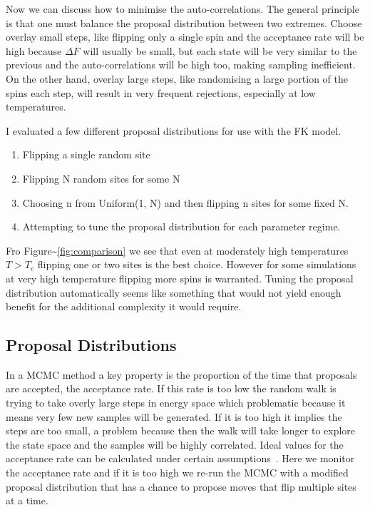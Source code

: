 Now we can discuss how to minimise the auto-correlations. The general principle is that one must balance the proposal distribution between two extremes. Choose overlay small steps, like flipping only a single spin and the acceptance rate will be high because \(\Delta F\) will usually be small, but each state will be very similar to the previous and the auto-correlations will be high too, making sampling inefficient. On the other hand, overlay large steps, like randomising a large portion of the spins each step, will result in very frequent rejections, especially at low temperatures.

I evaluated a few different proposal distributions for use with the FK model.

\begin{enumerate}
\def\labelenumi{\arabic{enumi}.}
\tightlist
\item
  Flipping a single random site
\item
  Flipping N random sites for some N
\item
  Choosing n from Uniform(1, N) and then flipping n sites for some fixed N.
\item
  Attempting to tune the proposal distribution for each parameter regime.
\end{enumerate}

Fro Figure\textasciitilde{}\ref{fig:comparison} we see that even at moderately high temperatures \(T > T_c\) flipping one or two sites is the best choice. However for some simulations at very high temperature flipping more spins is warranted. Tuning the proposal distribution automatically seems like something that would not yield enough benefit for the additional complexity it would require.

\hypertarget{proposal-distributions}{%
\subsection{Proposal Distributions}\label{proposal-distributions}}

In a MCMC method a key property is the proportion of the time that proposals are accepted, the acceptance rate. If this rate is too low the random walk is trying to take overly large steps in energy space which problematic because it means very few new samples will be generated. If it is too high it implies the steps are too small, a problem because then the walk will take longer to explore the state space and the samples will be highly correlated. Ideal values for the acceptance rate can be calculated under certain assumptions~\autocite{robertsWeakConvergenceOptimal1997}. Here we monitor the acceptance rate and if it is too high we re-run the MCMC with a modified proposal distribution that has a chance to propose moves that flip multiple sites at a time.

